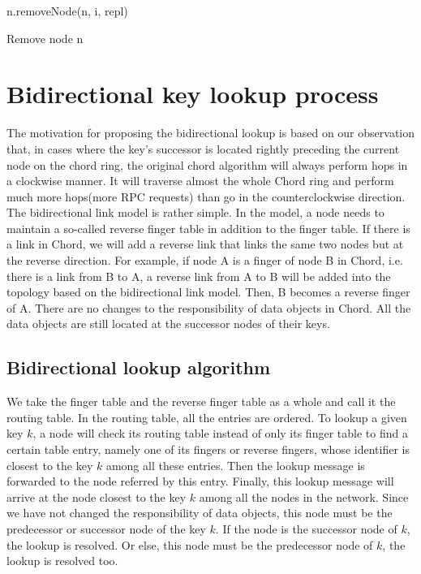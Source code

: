 \documentclass[letterpaper,twocolumn,10pt]{article}
\begin{document}
\begin{algorithm}
n.removeNode(n, i, repl)\\
\caption{Remove node n}
\end{algorithm}

\section{Bidirectional key lookup process}

The motivation for proposing the bidirectional lookup is based on our observation that, in cases where the key's successor is located rightly preceding the current node on the chord ring, the original chord algorithm will always perform hops in a clockwise manner. It will traverse almost the whole Chord ring and perform much more hops(more RPC requests) than go in the counterclockwise direction.  The bidirectional link model is rather simple. In the model, a node needs to maintain a so-called reverse finger table in addition to the finger table. If there is a link in Chord, we will add a reverse link that links the same two nodes but at the reverse direction. For example, if node A is a finger of node B in Chord, i.e. there is a link from B to A, a reverse link from A to B will be added into the topology based on the bidirectional link model. Then, B becomes a reverse finger of A. There are no changes to the responsibility of data objects in Chord. All the data objects are still located at the successor nodes of their keys.

\subsection{Bidirectional lookup algorithm}

We take the finger table and the reverse finger table as a whole and call it the routing table. In the routing table, all the entries are ordered. To lookup a given key $k$, a node will check its routing table instead of only its finger table to find a certain table entry, namely one of its fingers or reverse fingers, whose identifier is closest to the key $k$ among all these entries. Then the lookup message is forwarded to the node referred by this entry. Finally, this lookup message will arrive at the node closest to the key $k$ among all the nodes in the network. Since we have not changed the responsibility of data objects, this node must be the predecessor or successor node of the key $k$. If the node is the successor node of $k$, the lookup is resolved. Or else, this node must be the predecessor node of $k$, the lookup is resolved too.
\end{document}
